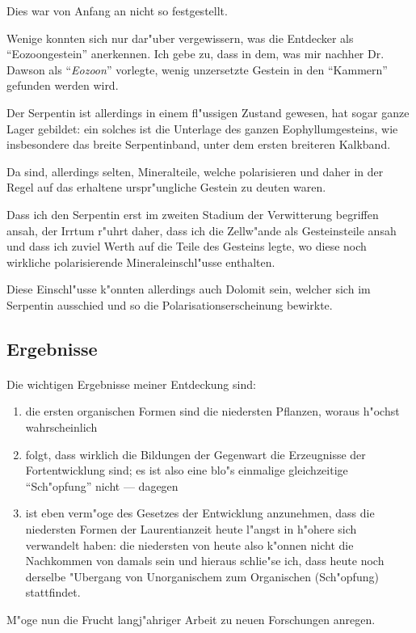 \documentclass[a4paper, 11pt, oneside, german]{article}
\begin{document}
Dies war von Anfang an nicht so festgestellt.

Wenige konnten sich nur dar"uber vergewissern, was die Entdecker als "`Eozoongestein"' anerkennen. Ich gebe zu, dass in dem, was mir nachher Dr. Dawson als "`\emph{Eozoon}"' vorlegte, wenig unzersetzte Gestein in den "`Kammern"' gefunden werden wird.

Der Serpentin ist allerdings in einem fl"ussigen Zustand gewesen, hat sogar ganze Lager gebildet: ein solches ist die Unterlage des ganzen Eophyllumgesteins, wie insbesondere das breite Serpentinband, unter dem ersten breiteren Kalkband.

Da sind, allerdings selten, Mineralteile, welche polarisieren und daher in der Regel auf das erhaltene urspr"ungliche Gestein zu deuten waren.

Dass ich den Serpentin erst im zweiten Stadium der Verwitterung begriffen ansah, der Irrtum r"uhrt daher, dass ich die Zellw"ande als Gesteinsteile ansah und dass ich zuviel Werth auf die Teile des Gesteins legte, wo diese noch wirkliche polarisierende Mineraleinschl"usse enthalten.

Diese Einschl"usse k"onnten allerdings auch Dolomit sein, welcher sich im Serpentin ausschied und so die Polarisationserscheinung bewirkte.
\clearpage
\subsection{Ergebnisse}
\paragraph{}
Die wichtigen Ergebnisse meiner Entdeckung sind:
\begin{enumerate}
\item die ersten organischen Formen sind die niedersten Pflanzen, woraus h"ochst wahrscheinlich
\item folgt, dass wirklich die Bildungen der Gegenwart die Erzeugnisse der Fortentwicklung sind; es ist also eine blo"s einmalige gleichzeitige "`Sch"opfung"' nicht --- dagegen
\item ist eben verm"oge des Gesetzes der Entwicklung anzunehmen, dass die niedersten Formen der Laurentianzeit heute l"angst in h"ohere sich verwandelt haben: die niedersten von heute also k"onnen nicht die Nachkommen von damals sein und hieraus schlie"se ich, dass heute noch derselbe "Ubergang von Unorganischem zum Organischen (Sch"opfung) stattfindet.
\end{enumerate}
M"oge nun die Frucht langj"ahriger Arbeit zu neuen Forschungen anregen.
\end{document}
